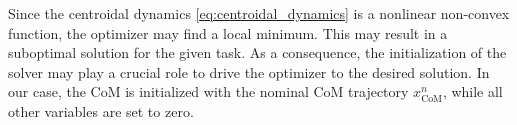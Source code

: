 \par
Since the centroidal dynamics \eqref{eq:centroidal_dynamics} is a nonlinear non-convex function, the optimizer may find a local minimum. This may
result in a suboptimal solution for the given task. As a consequence, the initialization of the solver may play a crucial role to drive the optimizer to the desired solution.
In our case, the CoM is initialized with the nominal CoM trajectory $x_{\text{CoM}}^n$, while all other variables are set to zero.


























    










